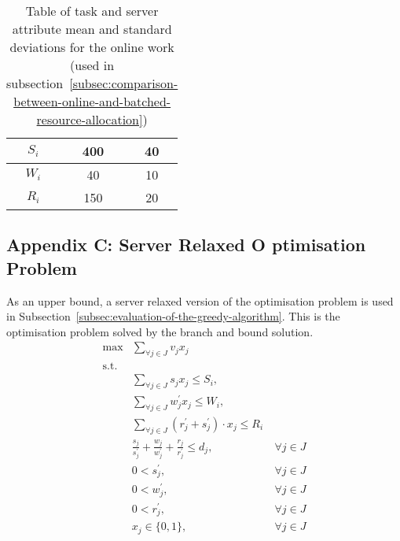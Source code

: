\begin{table}[h]
\begin{minipage}{2.8in}
\begin{tabular}{|c|c|c|}
            $S_i$          & 400  & 40                 \\ \hline
            $W_i$          & 40   & 10                 \\ \hline
            $R_i$          & 150  & 20                 \\ \hline
        \end{tabular}
        \caption{Table of task and server attribute mean and standard deviations for the online work
        (used in subsection~\ref{subsec:comparison-between-online-and-batched-resource-allocation})}
    \end{minipage}
    \label{tab:synthetic-models}
\end{table}

\subsection*{Appendix C: Server Relaxed O
ptimisation Problem}
As an upper bound, a server relaxed version of the optimisation problem is used in
Subsection~\ref{subsec:evaluation-of-the-greedy-algorithm}. This is the optimisation problem solved by the branch and
bound solution.
\begin{align}
    \max & \sum_{\forall j \in J} v_j x_j \label{eq:relaxed-objective} \\
    \mbox{s.t.} \nonumber \\
    & \sum_{\forall j \in J} s_j x_j \leq S_i, \label{eq:relaxed-server-storage-constraint} \\
    & \sum_{\forall j \in J} w^{'}_j x_j \leq W_i,  \label{eq:relaxed-server-computation-constraint} \\
    & \sum_{\forall j \in J} (r^{'}_j + s^{'}_j) \cdot x_j \leq R_i \label{eq:relaxed-server-bandwidth-constraint} \\
    & \frac{s_j}{s^{'}_j} + \frac{w_j}{w^{'}_j} + \frac{r_j}{r^{'}_j} \leq d_j, &~ \forall{j \in J} \label{eq:relaxed-task-deadline} \\
    & 0 < s^{'}_j, &~ \forall{j \in J} \label{eq:relaxed-loading-speeds} \\
    & 0 < w^{'}_j, &~ \forall{j \in J} \label{eq:relaxed-compute-speeds} \\
    & 0 < r^{'}_j, &~ \forall{j \in J} \label{eq:relaxed-sending-speeds} \\
    & x_j \in \{0, 1\}, &~ \forall{j \in J} \label{eq:relaxed-task-allocation}
\end{align}